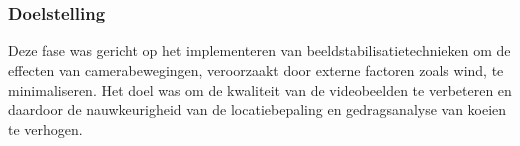 \chapter{}%
\label{ch:beeldstabilisatie}

\subsection{Doelstelling}
Deze fase was gericht op het implementeren van beeldstabilisatietechnieken om de effecten van camerabewegingen, veroorzaakt door externe factoren zoals wind, te minimaliseren. Het doel was om de kwaliteit van de videobeelden te verbeteren en daardoor de nauwkeurigheid van de locatiebepaling en gedragsanalyse van koeien te verhogen.

